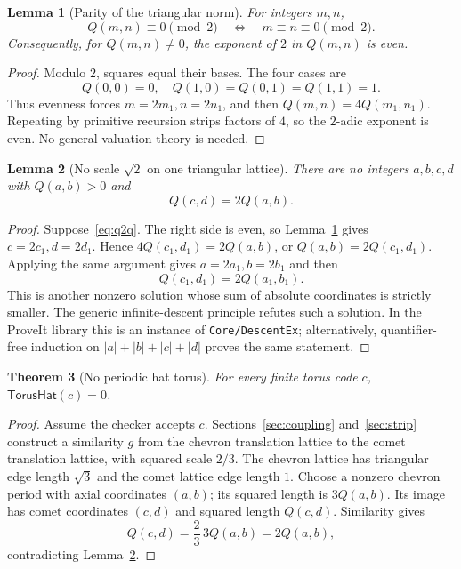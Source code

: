 \documentclass[11pt]{article}
\newtheorem{theorem}{Theorem}[section]
\newtheorem{lemma}[theorem]{Lemma}
\begin{document}
\begin{lemma}[Parity of the triangular norm]\label{lem:qparity}
For integers $m,n$,
\[
 Q(m,n)\equiv0\pmod2\quad\Longleftrightarrow\quad m\equiv n\equiv0\pmod2.
\]
Consequently, for $Q(m,n)\ne0$, the exponent of $2$ in $Q(m,n)$ is even.
\end{lemma}

\begin{proof}
Modulo $2$, squares equal their bases.  The four cases are
\[
 Q(0,0)=0,
 \quad Q(1,0)=Q(0,1)=Q(1,1)=1.
\]
Thus evenness forces $m=2m_1,n=2n_1$, and then
$Q(m,n)=4Q(m_1,n_1)$.  Repeating by primitive recursion strips factors of $4$, so the
$2$-adic exponent is even.  No general valuation theory is needed.
\end{proof}

\begin{lemma}[No scale $\sqrt2$ on one triangular lattice]\label{lem:nosqrt2}
There are no integers $a,b,c,d$ with $Q(a,b)>0$ and
\begin{equation}\label{eq:q2q}
 Q(c,d)=2Q(a,b).
\end{equation}
\end{lemma}

\begin{proof}
Suppose~\eqref{eq:q2q}.  The right side is even, so Lemma~\ref{lem:qparity} gives
$c=2c_1,d=2d_1$.  Hence $4Q(c_1,d_1)=2Q(a,b)$, or
$Q(a,b)=2Q(c_1,d_1)$.  Applying the same argument gives
$a=2a_1,b=2b_1$ and then
\[
 Q(c_1,d_1)=2Q(a_1,b_1).
\]
This is another nonzero solution whose sum of absolute coordinates is strictly smaller.
The generic infinite-descent principle refutes such a solution.  In the ProveIt library
this is an instance of \texttt{Core/DescentEx}; alternatively, quantifier-free induction
on $|a|+|b|+|c|+|d|$ proves the same statement.
\end{proof}

\begin{theorem}[No periodic hat torus]\label{thm:notorus}
For every finite torus code $c$, $\mathsf{TorusHat}(c)=0$.
\end{theorem}

\begin{proof}
Assume the checker accepts $c$.  Sections~\ref{sec:coupling} and~\ref{sec:strip} construct
a similarity $g$ from the chevron translation lattice to the comet translation lattice,
with squared scale $2/3$.  The chevron lattice has triangular edge length $\sqrt3$ and the
comet lattice edge length $1$.  Choose a nonzero chevron period with axial coordinates
$(a,b)$; its squared length is $3Q(a,b)$.  Its image has comet coordinates $(c,d)$ and
squared length $Q(c,d)$.  Similarity gives
\[
 Q(c,d)=\frac23\,3Q(a,b)=2Q(a,b),
\]
contradicting Lemma~\ref{lem:nosqrt2}.
\end{proof}
\end{document}
